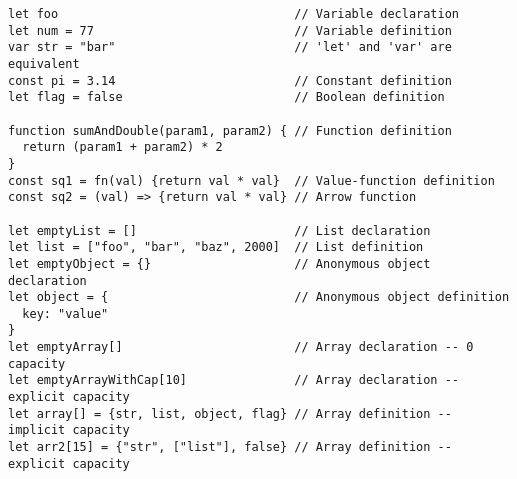 \vspace{-2.25em}
\begin{center}
\begin{minipage}[t]{1\textwidth}
\begin{listing}[H]
\begin{spacing}{0.6}
\begin{verbatim}
let foo                                 // Variable declaration
let num = 77                            // Variable definition
var str = "bar"                         // 'let' and 'var' are equivalent
const pi = 3.14                         // Constant definition
let flag = false                        // Boolean definition

function sumAndDouble(param1, param2) { // Function definition
  return (param1 + param2) * 2
}
const sq1 = fn(val) {return val * val}  // Value-function definition
const sq2 = (val) => {return val * val} // Arrow function

let emptyList = []                      // List declaration
let list = ["foo", "bar", "baz", 2000]  // List definition
let emptyObject = {}                    // Anonymous object declaration
let object = {                          // Anonymous object definition
  key: "value"
}
let emptyArray[]                        // Array declaration -- 0 capacity
let emptyArrayWithCap[10]               // Array declaration -- explicit capacity
let array[] = {str, list, object, flag} // Array definition -- implicit capacity
let arr2[15] = {"str", ["list"], false} // Array definition -- explicit capacity
\end{verbatim}
\end{spacing}
\end{listing}
\end{minipage}
\end{center}
